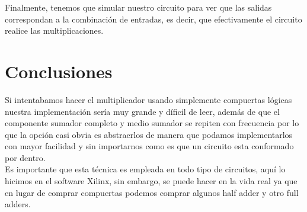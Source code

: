 \documentclass{mylib/reporteConCalif}
\begin{document}

Finalmente, tenemos que simular nuestro circuito para ver que las salidas correspondan a la combinación de entradas, es decir, que efectivamente el circuito realice las multiplicaciones.


\section{Conclusiones}

Si intentabamos hacer el multiplicador usando simplemente compuertas lógicas nuestra implementación sería muy grande y díficil de leer, además de que el componente sumador completo y medio sumador se repiten con frecuencia por lo que la opción casi obvia es abstraerlos de manera que podamos implementarlos con mayor facilidad y sin importarnos como es que un circuito esta conformado por dentro.\\

Es importante que esta técnica es empleada en todo tipo de circuitos, aquí lo hicimos en el software Xilinx, sin embargo, se puede hacer en la vida real ya que en lugar de comprar compuertas podemos comprar algunos half adder y otro full adders.
\end{document}
